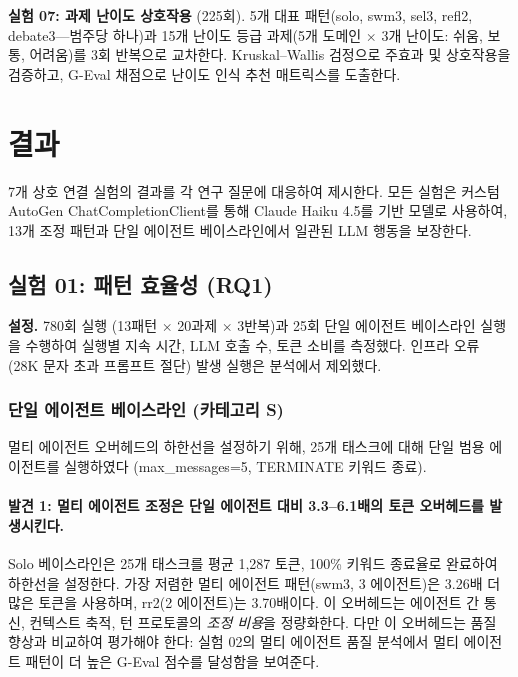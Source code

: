 \documentclass[a4paper,11pt]{article}
\begin{document}
\textbf{실험 07: 과제 난이도 상호작용} (225회). 5개 대표 패턴(solo, swm3, sel3, refl2, debate3---범주당 하나)과 15개 난이도 등급 과제(5개 도메인 $\times$ 3개 난이도: 쉬움, 보통, 어려움)를 3회 반복으로 교차한다. Kruskal--Wallis 검정으로 주효과 및 상호작용을 검증하고, G-Eval 채점으로 난이도 인식 추천 매트릭스를 도출한다.

\section{결과}
\label{sec:results}

7개 상호 연결 실험의 결과를 각 연구 질문에 대응하여 제시한다. 모든 실험은 커스텀 AutoGen ChatCompletionClient를 통해 Claude Haiku 4.5를 기반 모델로 사용하여, 13개 조정 패턴과 단일 에이전트 베이스라인에서 일관된 LLM 행동을 보장한다.

\subsection{실험 01: 패턴 효율성 (RQ1)}

\textbf{설정.} 780회 실행 (13패턴 $\times$ 20과제 $\times$ 3반복)과 25회 단일 에이전트 베이스라인 실행을 수행하여 실행별 지속 시간, LLM 호출 수, 토큰 소비를 측정했다. 인프라 오류 (28K 문자 초과 프롬프트 절단) 발생 실행은 분석에서 제외했다.

\subsubsection{단일 에이전트 베이스라인 (카테고리 S)}

멀티 에이전트 오버헤드의 하한선을 설정하기 위해, 25개 태스크에 대해 단일 범용 에이전트를 실행하였다 (max\_messages=5, TERMINATE 키워드 종료).


\paragraph{발견 1: 멀티 에이전트 조정은 단일 에이전트 대비 3.3--6.1배의 토큰 오버헤드를 발생시킨다.}
Solo 베이스라인은 25개 태스크를 평균 1,287 토큰, 100\% 키워드 종료율로 완료하여 하한선을 설정한다. 가장 저렴한 멀티 에이전트 패턴(swm3, 3 에이전트)은 3.26배 더 많은 토큰을 사용하며, rr2(2 에이전트)는 3.70배이다. 이 오버헤드는 에이전트 간 통신, 컨텍스트 축적, 턴 프로토콜의 \emph{조정 비용}을 정량화한다. 다만 이 오버헤드는 품질 향상과 비교하여 평가해야 한다: 실험 02의 멀티 에이전트 품질 분석에서 멀티 에이전트 패턴이 더 높은 G-Eval 점수를 달성함을 보여준다.
\end{document}
